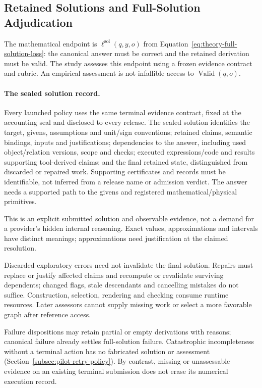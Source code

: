 \documentclass[10pt]{article} %
\providecommand{\1}{\mathbf{1}}  %
\theoremstyle{remark}
\theoremstyle{definition}
\begin{document}
\subsection{Retained Solutions and Full-Solution Adjudication}
\label{subsec:pilot-solution-adjudication}

The mathematical endpoint is
$\ell^{\mathrm{sol}}(q,y,o)$ from
Equation~\ref{eq:theory-full-solution-loss}: the canonical answer
must be correct and the retained derivation must be valid. The study
assesses this endpoint using a frozen evidence contract and rubric.
An empirical assessment is not infallible access to
$\operatorname{Valid}(q,o)$.

\paragraph{The sealed solution record.}

Every launched policy uses the same terminal evidence contract, fixed at
the accounting seal and disclosed to every release. The sealed solution
identifies the target, givens, assumptions and unit/sign conventions;
retained claims, semantic bindings, inputs and justifications; dependencies
to the answer, including used object/relation versions, scope and checks;
executed expressions/code and results supporting tool-derived claims; and
the final retained state, distinguished from discarded or repaired work.
Supporting certificates and records must be identifiable, not inferred from
a release name or admission verdict. The answer needs a supported path to
the givens and registered mathematical/physical primitives.

This is an explicit submitted solution and observable evidence, not a demand
for a provider's hidden internal reasoning. Exact values, approximations and
intervals have distinct meanings; approximations need justification at the
claimed resolution.

Discarded exploratory errors need not invalidate the final solution. Repairs
must replace or justify affected claims and recompute or revalidate surviving
dependents; changed flags, stale descendants and cancelling mistakes do not
suffice. Construction, selection, rendering and checking consume runtime
resources. Later assessors cannot supply missing work or select a more
favorable graph after reference access.

Failure dispositions may retain partial or empty derivations with reasons;
canonical failure already settles full-solution failure. Catastrophic
incompleteness without a terminal action has no fabricated solution or
assessment (Section~\ref{subsec:pilot-retry-policy}). By contrast, missing
or unassessable evidence on an existing terminal submission does not erase
its numerical execution record.
\end{document}
